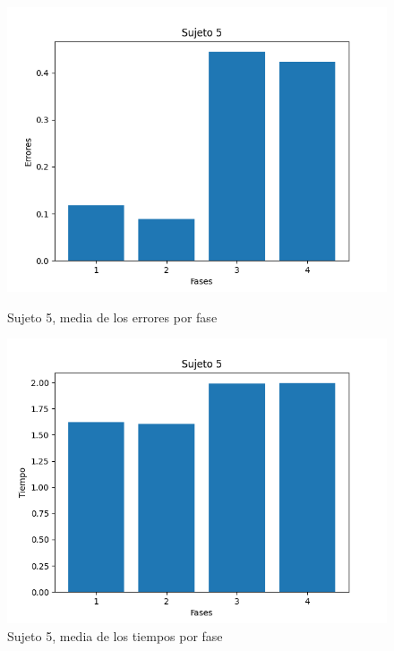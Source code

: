 \documentclass[a4paper,11pt, oneside]{book}
\begin{document}
\begin{figure}[H]
	\begin{minipage}[b]{0.5\linewidth}
		\centering
		\includegraphics[width=\linewidth]{sujeto5-errores}
		\caption{Sujeto 5, media de los errores por fase}
		\label{sujeto5-errores}
	\end{minipage}
	\hspace{0.5cm}
	\begin{minipage}[b]{0.5\linewidth}
		\centering
		\includegraphics[width=\linewidth]{sujeto5-time}
		\caption{Sujeto 5, media de los tiempos por fase}
		\label{sujeto5-time}
	\end{minipage}
\end{figure}
\end{document}
